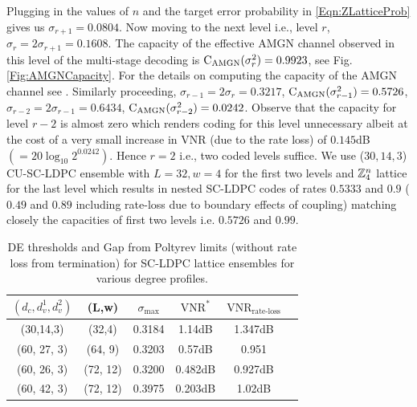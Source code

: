 Plugging in the values of $n$ and the target error probability in \eqref{Eqn:ZLatticeProb} gives us $\sigma_{r+1}= 0.0804$. Now moving to the next level i.e., level $r$, $\sigma_{r}=2\sigma_{r+1}=0.1608$. The capacity of the effective AMGN channel observed in this level of the multi-stage decoding is $\text{C}_{\text{AMGN}}(\sigma^{2}_{r})=0.9923$, see Fig. \ref{Fig:AMGNCapacity}. For the details on computing the capacity of the AMGN channel see \cite{forney2000}.  Similarly proceeding, $\sigma_{r-1}=2\sigma_{r}=0.3217$, $\text{C}_{\text{AMGN}}(\sigma^{2}_{r-1})=0.5726$, $\sigma_{r-2}=2\sigma_{r-1}=0.6434$, $\text{C}_{\text{AMGN}}(\sigma^{2}_{r-2})=0.0242$. Observe that the capacity for level $r-2$ is almost zero which renders coding for this level unnecessary albeit at the cost of a very small increase in VNR (due to the rate loss) of $0.145$dB $(=20\log_{10}2^{0.0242})$. Hence $r=2$ i.e., two coded levels suffice. We use ($30,14,3$) CU-SC-LDPC ensemble with $L=32, w=4$ for the first two levels and $\mathbb{Z}_{4}^{n}$ lattice for the last level which results in nested SC-LDPC codes of rates $0.5333$ and $0.9$ ($0.49$ and $0.89$ including rate-loss due to boundary effects of coupling) matching closely the capacities of first two levels i.e. $0.5726$ and $0.99$.
\begin{table}
\centering
\caption{DE thresholds and Gap from Poltyrev limits (without rate loss from termination) for SC-LDPC lattice ensembles for various degree profiles.}
\begin{tabular}{c c c c c c}
\hline  \hline
$(d_{c},d_{v}^{1},d_{v}^{2})$ &(L,w)& $\sigma_{\text{max}}$ &$\text{VNR}^{*}$ &$\text{VNR}_{\text{rate-loss}}$\\
\hline
(30,14,3) & (32,4) & 0.3184 & 1.14dB & 1.347dB\\
(60, 27, 3)& (64, 9)  &  0.3203 & 0.57dB & 0.951\\
(60, 26, 3)& (72, 12) & 0.3200 &0.482dB & 0.927dB\\
(60, 42, 3)& (72, 12) & 0.3975 & 0.203dB &1.02dB\\
\end{tabular}
\label{Table:Thresholds}
\end{table}

